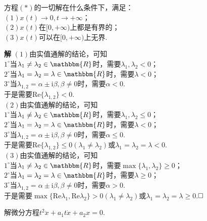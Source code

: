 \documentclass{ctexart}
\newenvironment{custom}[1]{\par\noindent \textbf{#1}\quad}{\par\vspace{1em}}
\begin{document}
\begin{example}
方程$(*)$的一切解在什么条件下，满足：\\
$(1)x(t)\to 0,t\to+\infty$；\\
$(2)x(t)$在$[0,+\infty)$上都是有界的；\\
$(3)x(t)$可以在$[0,+\infty)$上无界.
\end{example}

\begin{custom}{解}
$(1)$由实值通解的结论，可知\\
$1^{\circ}$当$\lambda_{1}\neq \lambda_{2}\in\mathbbm{R}$时，需要$\lambda_{1},\lambda_{2}<0$；\\
$2^{\circ}$当$\lambda_{1}= \lambda_{2}=\lambda\in\mathbbm{R}$时，需要$\lambda<0$；\\
$3^{\circ}$当$\lambda_{1,2}=\alpha\pm\mathrm{i}\beta,\beta\neq 0$时，需要$\alpha<0$.\\
于是需要$\mathrm{Re}\{\lambda_{1,2}\}<0$.\\
$(2)$由实值通解的结论，可知\\
$1^{\circ}$当$\lambda_{1}\neq \lambda_{2}\in\mathbbm{R}$时，需要$\lambda_{1},\lambda_{2}\le 0$；\\
$2^{\circ}$当$\lambda_{1}= \lambda_{2}=\lambda\in\mathbbm{R}$时，需要$\lambda<0$；\\
$3^{\circ}$当$\lambda_{1,2}=\alpha\pm\mathrm{i}\beta,\beta\neq 0$时，需要$\alpha\le 0$.\\
于是需要$\mathrm{Re}\{\lambda_{1,2}\}\le 0(\lambda_{1}\neq \lambda_{2})$或$\lambda_{1}=\lambda_{2}=\lambda<0$.\\
$(3)$由实值通解的结论，可知\\
$1^{\circ}$当$\lambda_{1}\neq \lambda_{2}\in\mathbbm{R}$时，需要$\max{\{\lambda_{1},\lambda_{2}\}}\ge 0$；\\
$2^{\circ}$当$\lambda_{1}= \lambda_{2}=\lambda\in\mathbbm{R}$时，需要$\lambda\ge 0$；\\
$3^{\circ}$当$\lambda_{1,2}=\alpha\pm\mathrm{i}\beta,\beta\neq 0$时，需要$\alpha> 0$.\\
于是需要$\max{\{\mathrm{Re}\lambda_{1},\mathrm{Re}\lambda_{2}\}}>0(\lambda_{1}\neq \lambda_{2})$或$\lambda_{1}=\lambda_{2}=\lambda\ge 0$.$\hfill{\square}$
\end{custom}

\begin{example}[Euler方程]
解微分方程$t^{2}\ddot{x}+a_{1}t\dot{x}+a_{2}x=0$.
\end{example}
\end{document}
